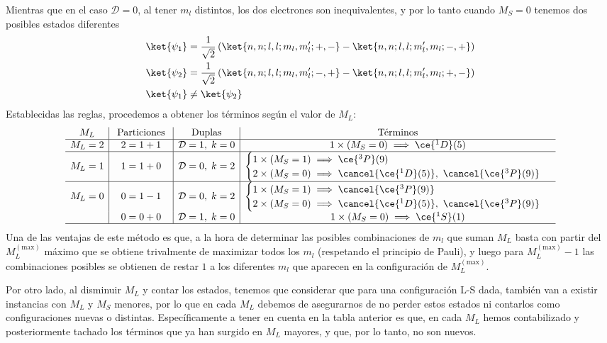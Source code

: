Mientras que en el caso $\mathcal{D}=0$, al tener $m_{l}$ distintos, 
los dos electrones son inequivalentes, y por lo tanto 
cuando $M_{S}=0$ tenemos dos posibles estados diferentes 
\begin{align*}
  \ket{\psi_{1}} &= \frac{1}{\sqrt{2}}\left(\ket{n,n;l,l;m_{l},m_{l}';+,-}-\ket{n,n;l,l;m_{l}',m_{l};-,+}\right)\\
 \ket{\psi_{2}} &= \frac{1}{\sqrt{2}}\left(\ket{n,n;l,l;m_{l},m_{l}';-,+}-\ket{n,n;l,l;m_{l}',m_{l};+,-}\right)\\
  \ket{\psi_{1}}&\ne \ket{\psi_{2}}
\end{align*}
Establecidas las reglas, procedemos a obtener los términos según el valor de $M_{L}$:
\begin{align*}
 \begin{array}{c | c | c | c}
  M_{L} & \text{ Particiones } & \text{ Duplas } & \text{ Términos }\\
  \hline 
  M_{L} = 2 & 2 = 1 + 1 & \mathcal{D} = 1,\; k = 0 & 1 \times (M_{S} = 0) \implies \ce{^{1}D}(5)\\
  \hline 
  M_{L} = 1 & 1 = 1 + 0 & \mathcal{D} = 0,\; k = 2 & \begin{cases}
    1 \times (M_{S} = 1) \implies \ce{^{3}P}(9)\\
    2 \times (M_{S} = 0) \implies \cancel{\ce{^{1}D}(5)},\ \cancel{\ce{^{3}P}(9)}
    \end{cases}\\
    \hline 
  M_{L} = 0 & 0 = 1 - 1 & \mathcal{D} = 0,\; k = 2 & \begin{cases}
    1 \times (M_{S} = 1) \implies \cancel{\ce{^{3}P}(9)}\\
    2 \times (M_{S} = 0) \implies \cancel{\ce{^{1}D}(5)},\ \cancel{\ce{^{3}P}(9)}
    \end{cases}\\
  & 0 = 0 + 0 & \mathcal{D} = 1,\; k = 0 & 1 \times (M_{S} = 0) \implies \ce{^{1}S}(1)\\
  \hline
  \end{array}
  \end{align*}
Una de las ventajas de este método es que, a la hora 
de determinar las posibles combinaciones de $m_{l}$ que 
suman $M_{L}$ basta con partir del $M_{L}^{(\text{max})}$ máximo que 
se obtiene trivalmente de maximizar todos los $m_{l}$ 
(respetando el principio de Pauli), y luego para 
$M_{L}^{(\text{max})}-1$ las combinaciones posibles se obtienen 
de restar $1$ a los diferentes $m_{l}$ que aparecen 
en la configuración de $M_{L}^{(\text{max})}$.\par 
Por otro lado, al disminuir $M_{L}$ y contar los 
estados, tenemos que considerar que para una 
configuración L-S dada, también van a 
existir instancias con  $M_{L}$ y $M_{S}$ menores, 
por lo que en cada $M_{L}$ debemos de asegurarnos 
de no perder estos estados ni contarlos como 
configuraciones nuevas o distintas. Específicamente a tener en cuenta en la tabla anterior es que, en cada $M_{L}$ hemos contabilizado y posteriormente tachado los términos que ya han surgido en $M_{L}$ mayores, y que, por lo tanto, no son nuevos.\par

